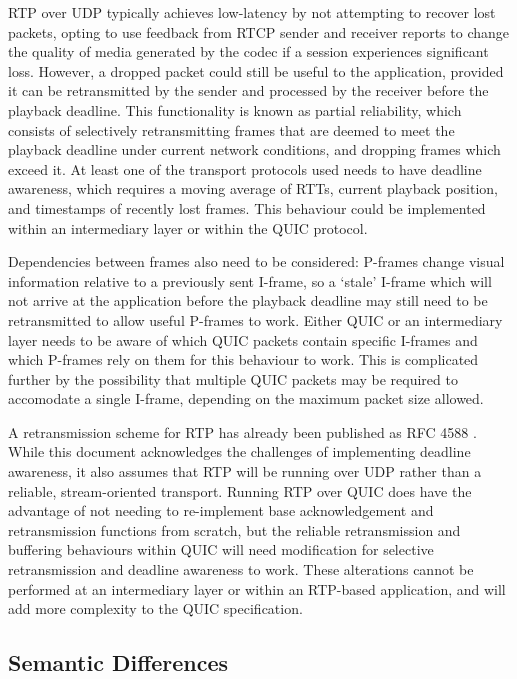\documentclass{mprop}
\begin{document}
RTP over UDP typically achieves low-latency by not attempting to recover lost packets, opting to use feedback from RTCP sender and receiver reports to change the quality of media generated by the codec if a session experiences significant loss. However, a dropped packet could still be useful to the application, provided it can be retransmitted by the sender and processed by the receiver before the playback deadline. This functionality is known as partial reliability, which consists of selectively retransmitting frames that are deemed to meet the playback deadline under current network conditions, and dropping frames which exceed it. At least one of the transport protocols used needs to have deadline awareness, which requires a moving average of RTTs, current playback position, and timestamps of recently lost frames. This behaviour could be implemented within an intermediary layer or within the QUIC protocol.

Dependencies between frames also need to be considered: P-frames change visual information relative to a previously sent I-frame, so a `stale' I-frame which will not arrive at the application before the playback deadline may still need to be retransmitted to allow useful P-frames to work. Either QUIC or an intermediary layer needs to be aware of which QUIC packets contain specific I-frames and which P-frames rely on them for this behaviour to work. This is complicated further by the possibility that multiple QUIC packets may be required to accomodate a single I-frame, depending on the maximum packet size allowed.

A retransmission scheme for RTP has already been published as RFC 4588 \cite{RTP-retransmission-RFC}. While this document acknowledges the challenges of implementing deadline awareness, it also assumes that RTP will be running over UDP rather than a reliable, stream-oriented transport. Running RTP over QUIC does have the advantage of not needing to re-implement base acknowledgement and retransmission functions from scratch, but the reliable retransmission and buffering behaviours within QUIC will need modification for selective retransmission and deadline awareness to work. These alterations cannot be performed at an intermediary layer or within an RTP-based application, and will add more complexity to the QUIC specification.

\subsection{Semantic Differences}
\end{document}
